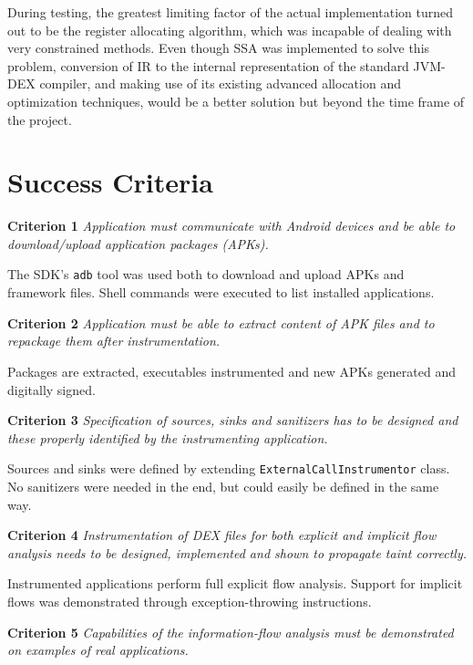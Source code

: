 \documentclass[12pt,twoside,notitlepage]{report}
\begin{document}
During testing, the greatest limiting factor of the actual implementation turned out to be the register allocating algorithm, which was incapable of dealing with very constrained methods. Even though SSA was implemented to solve this problem, conversion of IR to the internal representation of the standard JVM-DEX compiler, and making use of its existing advanced allocation and optimization techniques, would be a better solution but beyond the time frame of the project.

\section{Success Criteria}

\begin{description}
	\item \textbf{Criterion 1} \emph{Application must communicate with Android devices and be able to download/upload application packages (APKs).}

	The SDK's \verb$adb$ tool was used both to download and upload APKs and framework files. Shell commands were executed to list installed applications.

	\item \textbf{Criterion 2} \emph{Application must be able to extract content of APK files and to repackage them after instrumentation.}

	Packages are extracted, executables instrumented and new APKs generated and digitally signed.

	\item \textbf{Criterion 3} \emph{Specification of sources, sinks and sanitizers has to be designed and these properly identified by the instrumenting application.}

	Sources and sinks were defined by extending \verb$ExternalCallInstrumentor$ class. No sanitizers were needed in the end, but could easily be defined in the same way.

	\item \textbf{Criterion 4} \emph{Instrumentation of DEX files for both explicit and implicit flow analysis needs to be designed, implemented and shown to propagate taint correctly.}

	Instrumented applications perform full explicit flow analysis. Support for implicit flows was demonstrated through exception-throwing instructions.

	\item \textbf{Criterion 5} \emph{Capabilities of the information-flow analysis must be demonstrated on examples of real applications.}


\end{description}
\end{document}
